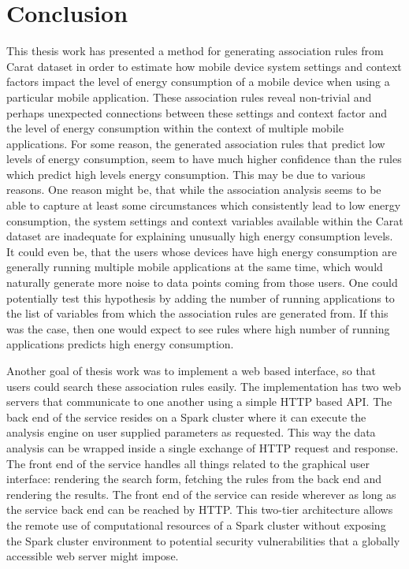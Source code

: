 \section{Conclusion}

This thesis work has presented a method for generating association rules from Carat dataset in order to estimate how mobile device system settings and context factors impact the level of energy consumption of a mobile device when using a particular mobile application. These association rules reveal non-trivial and perhaps unexpected connections between these settings and context factor and the level of energy consumption within the context of multiple mobile applications. For some reason, the generated association rules that predict low levels of energy consumption, seem to have much higher confidence than the rules which predict high levels energy consumption. This may be due to various reasons. One reason might be, that while the association analysis seems to be able to capture at least some circumstances which consistently lead to low energy consumption, the system settings and context variables available within the Carat dataset are inadequate for explaining unusually high energy consumption levels. It could even be, that the users whose devices have high energy consumption are generally running multiple mobile applications at the same time, which would naturally generate more noise to data points coming from those users. One could potentially test this hypothesis by adding the number of running applications to the list of variables from which the association rules are generated from. If this was the case, then one would expect to see rules where high number of running applications predicts high energy consumption. 

Another goal of thesis work was to implement a web based interface, so that users could search these association rules easily. The implementation has two web servers that communicate to one another using a simple HTTP based API. The back end of the service resides on a Spark cluster where it can execute the analysis engine on user supplied parameters as requested. This way the data analysis can be wrapped inside a single exchange of HTTP request and response. The front end of the service handles all things related to the graphical user interface: rendering the search form, fetching the rules from the back end and rendering the results. The front end of the service can reside wherever as long as the service back end can be reached by HTTP. This two-tier architecture allows the remote use of computational resources of a Spark cluster without exposing the Spark cluster environment to potential security vulnerabilities that a globally accessible web server might impose.


